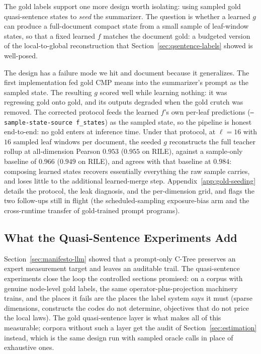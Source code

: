 The gold labels support one more design worth isolating: using sampled
gold quasi-sentence states to \emph{seed} the summarizer. The question
is whether a learned $g$ can produce a full-document compact state from
a small sample of leaf-window states, so that a fixed learned $f$
matches the document gold: a budgeted version of the local-to-global
reconstruction that Section~\ref{sec:qsentence-labels} showed is
well-posed.

The design has a failure mode we hit and document because it
generalizes. The first implementation fed gold CMP means into the
summarizer's prompt as the sampled state. The resulting $g$ scored
well while learning nothing: it was regressing gold onto gold, and its
outputs degraded when the gold crutch was removed. The corrected
protocol feeds the learned $f$'s own per-leaf predictions
(\texttt{--sample-state-source f\_states}) as the sampled state, so
the pipeline is honest end-to-end: no gold enters at inference time.
Under that protocol, at $\ell = 16$ with $16$ sampled leaf windows per
document, the seeded $g$ reconstructs the full teacher rollup at
all-dimension Pearson $0.953$ ($0.955$ on RILE), against a
sample-only baseline of $0.966$ ($0.949$ on RILE), and agrees with
that baseline at $0.984$: composing learned states recovers
essentially everything the raw sample carries, and loses little to
the additional learned-merge step. Appendix~\ref{app:gold-seeding}
details the protocol, the leak diagnosis, and the per-dimension grid,
and flags the two follow-ups still in flight (the scheduled-sampling
exposure-bias arm and the cross-runtime transfer of gold-trained
prompt programs).

\subsection{What the Quasi-Sentence Experiments Add}

Section~\ref{sec:manifesto-llm} showed that a prompt-only C-Tree
preserves an expert measurement target and leaves an auditable trail.
The quasi-sentence experiments close the loop the controlled sections
promised: on a corpus with genuine node-level gold labels, the same
operator-plus-projection machinery trains, and the places it fails are
the places the label system says it must (sparse dimensions, constructs
the codes do not determine, objectives that do not price the local
laws). The gold quasi-sentence layer is what makes all of this
measurable; corpora without such a layer get the audit of
Section~\ref{sec:estimation} instead, which is the same design run
with sampled oracle calls in place of exhaustive ones.

